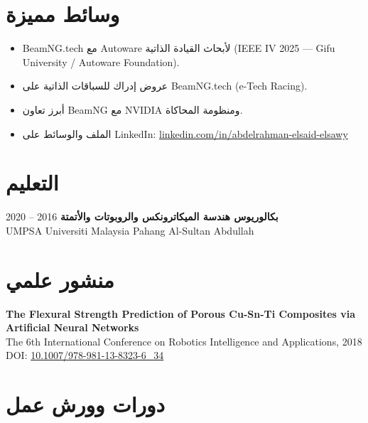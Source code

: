 \documentclass[11pt,a4paper]{article}
\newcommand{\en}[1]{\textenglish{#1}}
\begin{document}
\section*{وسائط مميزة}

\begin{itemize}
    \item \en{BeamNG.tech} مع \en{Autoware} لأبحاث القيادة الذاتية (\en{IEEE IV 2025} — \en{Gifu University / Autoware Foundation}).
    \item عروض إدراك للسباقات الذاتية على \en{BeamNG.tech} (\en{e-Tech Racing}).
    \item أبرز تعاون \en{BeamNG} مع \en{NVIDIA} ومنظومة المحاكاة.
    \item الملف والوسائط على \en{LinkedIn}: \href{https://www.linkedin.com/in/abdelrahman-elsaid-elsawy}{\en{linkedin.com/in/abdelrahman-elsaid-elsawy}}
\end{itemize}

\section*{التعليم}

\textbf{\color{PrimaryColor}بكالوريوس هندسة الميكاترونكس والروبوتات والأتمتة}
\hfill 2016 -- 2020\\
\en{UMPSA Universiti Malaysia Pahang Al-Sultan Abdullah}

\section*{منشور علمي}

\textbf{\color{PrimaryColor}\en{The Flexural Strength Prediction of Porous Cu-Sn-Ti Composites via Artificial Neural Networks}}\\
\en{The 6th International Conference on Robotics Intelligence and Applications, 2018}\\
\en{DOI:}
\href{https://doi.org/10.1007/978-981-13-8323-6_34}
{\en{10.1007/978-981-13-8323-6\_34}}

\section*{دورات وورش عمل}
\end{document}
